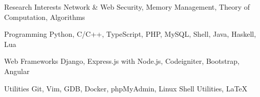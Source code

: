 


\begin{cvskills}

  \cvskill
  {Research Interests}
  {Network \& Web Security, Memory Management, Theory of Computation, Algorithms}  
  
  \cvskill
  {Programming}
  {Python, C/C++, TypeScript, PHP, MySQL, Shell, Java, Haskell, Lua}


  \cvskill
  {Web Frameworks}
  {Django, Express.js with Node.js, Codeigniter, Bootstrap, Angular}

  \cvskill
  {Utilities}
  {Git, Vim, GDB, Docker, phpMyAdmin, Linux Shell Utilities, \LaTeX}


\end{cvskills}

